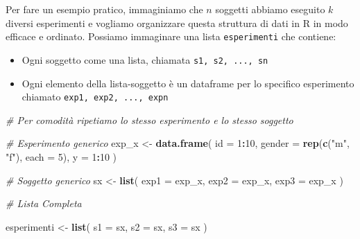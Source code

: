 \documentclass[
]{book}
\newenvironment{Shaded}{\begin{snugshade}}{\end{snugshade}}
\newcommand{\CommentTok}[1]{\textcolor[rgb]{0.56,0.35,0.01}{\textit{#1}}}
\newcommand{\DataTypeTok}[1]{\textcolor[rgb]{0.13,0.29,0.53}{#1}}
\newcommand{\DecValTok}[1]{\textcolor[rgb]{0.00,0.00,0.81}{#1}}
\newcommand{\KeywordTok}[1]{\textcolor[rgb]{0.13,0.29,0.53}{\textbf{#1}}}
\newcommand{\NormalTok}[1]{#1}
\newcommand{\OperatorTok}[1]{\textcolor[rgb]{0.81,0.36,0.00}{\textbf{#1}}}
\newcommand{\StringTok}[1]{\textcolor[rgb]{0.31,0.60,0.02}{#1}}
\providecommand{\tightlist}{%
  \setlength{\itemsep}{0pt}\setlength{\parskip}{0pt}}
\begin{document}
Per fare un esempio pratico, immaginiamo che \(n\) soggetti abbiamo eseguito \(k\) diversi esperimenti e vogliamo organizzare questa struttura di dati in R in modo efficace e ordinato. Possiamo immaginare una lista \texttt{esperimenti} che contiene:

\begin{itemize}
\tightlist
\item
  Ogni soggetto come una lista, chiamata \texttt{s1,\ s2,\ ...,\ sn}
\item
  Ogni elemento della lista-soggetto è un dataframe per lo specifico esperimento chiamato \texttt{exp1,\ exp2,\ ...,\ expn}
\end{itemize}

\begin{Shaded}
\begin{Highlighting}[]

\CommentTok{# Per comodità ripetiamo lo stesso esperimento e lo stesso soggetto}

\CommentTok{# Esperimento generico}
\NormalTok{exp_x <-}\StringTok{ }\KeywordTok{data.frame}\NormalTok{(}
  \DataTypeTok{id =} \DecValTok{1}\OperatorTok{:}\DecValTok{10}\NormalTok{,}
  \DataTypeTok{gender =} \KeywordTok{rep}\NormalTok{(}\KeywordTok{c}\NormalTok{(}\StringTok{"m"}\NormalTok{, }\StringTok{"f"}\NormalTok{), }\DataTypeTok{each =} \DecValTok{5}\NormalTok{),}
  \DataTypeTok{y =} \DecValTok{1}\OperatorTok{:}\DecValTok{10}
\NormalTok{)}

\CommentTok{# Soggetto generico}
\NormalTok{sx <-}\StringTok{ }\KeywordTok{list}\NormalTok{(}
  \DataTypeTok{exp1 =}\NormalTok{ exp_x,}
  \DataTypeTok{exp2 =}\NormalTok{ exp_x,}
  \DataTypeTok{exp3 =}\NormalTok{ exp_x}
\NormalTok{)}

\CommentTok{# Lista Completa}

\NormalTok{esperimenti <-}\StringTok{ }\KeywordTok{list}\NormalTok{(}
  \DataTypeTok{s1 =}\NormalTok{ sx,}
  \DataTypeTok{s2 =}\NormalTok{ sx,}
  \DataTypeTok{s3 =}\NormalTok{ sx}
\NormalTok{)}


\end{Highlighting}
\end{Shaded}
\end{document}
